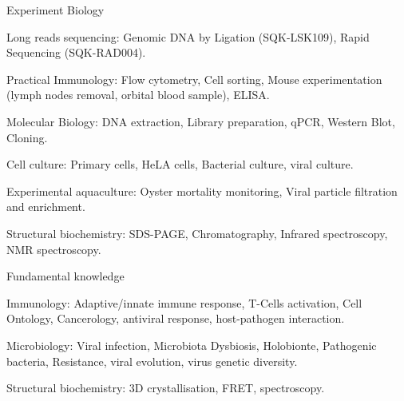 

\begin{cventries}

  \cventry
    {Experiment} %
    {Biology} %
    {} %
    {} %
    {
      \begin{cvitems} %
        \item {Long reads sequencing: Genomic DNA by Ligation (SQK-LSK109), Rapid Sequencing (SQK-RAD004).}
        \item {Practical Immunology: Flow cytometry, Cell sorting, Mouse experimentation (lymph nodes removal, orbital blood sample), ELISA.}
        \item {Molecular Biology: DNA extraction, Library preparation, qPCR, Western Blot, Cloning.}
        \item {Cell culture: Primary cells, HeLA cells, Bacterial culture, viral culture.}
        \item {Experimental aquaculture: Oyster mortality monitoring, Viral particle filtration and enrichment.}
        \item {Structural biochemistry: SDS-PAGE, Chromatography, Infrared spectroscopy, NMR spectroscopy.}
      \end{cvitems}
    }

  \cventry
    {Fundamental knowledge} %
    {} %
    {} %
    {} %
    {
      \begin{cvitems} %
        \item {Immunology: Adaptive/innate immune response, T-Cells activation, Cell Ontology, Cancerology, antiviral response, host-pathogen interaction.}
        \item {Microbiology: Viral infection, Microbiota Dysbiosis, Holobionte, Pathogenic bacteria, Resistance, viral evolution, virus genetic diversity.}
        \item {Structural biochemistry: 3D crystallisation, FRET, spectroscopy.}
      \end{cvitems}
    }


\end{cventries}
